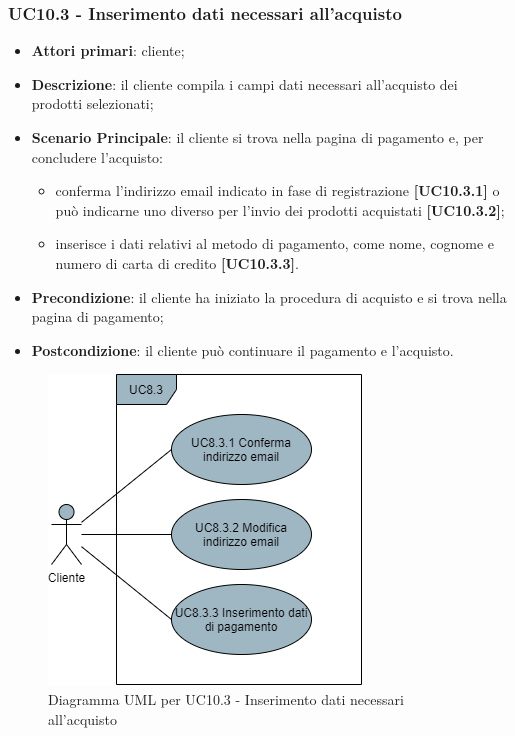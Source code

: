 \subsubsection{UC10.3 - Inserimento dati necessari all'acquisto}
\begin{itemize}
\item \textbf{Attori primari}: cliente;
\item \textbf{Descrizione}: il cliente compila i campi dati necessari all'acquisto dei prodotti selezionati;
\item \textbf{Scenario Principale}: il cliente si trova nella pagina di pagamento e, per concludere l'acquisto:
\begin{itemize}
	\item conferma l'indirizzo email indicato in fase di registrazione \textbf{[UC10.3.1]} o può indicarne uno diverso per l'invio dei prodotti acquistati \textbf{[UC10.3.2]};
	\item inserisce i dati relativi al metodo di pagamento, come nome, cognome e numero di carta di credito \textbf{[UC10.3.3]}.
\end{itemize}
\item \textbf{Precondizione}: il cliente ha iniziato la procedura di acquisto e si trova nella pagina di pagamento;
\item \textbf{Postcondizione}: il cliente può continuare il pagamento e l'acquisto.
\end{itemize}

\begin{figure}[H]
\centering
\includegraphics[scale=0.6]{res/UseCase/Immagini/InserimentoDatiAcquisto}
\caption{Diagramma UML per UC10.3 - Inserimento dati necessari all'acquisto}
\end{figure}

